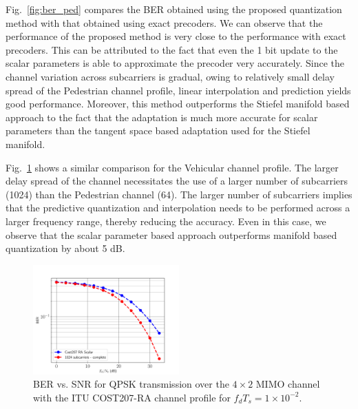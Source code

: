 \documentclass[journal,10pt,twocolumn]{IEEEtran}
\begin{document}
Fig.~\ref{fig:ber_ped} compares the BER obtained using the proposed
quantization method with that obtained using exact precoders. We can
observe that the performance of the proposed method is very close to
the performance with exact precoders. This can be attributed to the
fact that even the 1 bit update to the scalar parameters is able to
approximate the precoder very accurately. Since the channel variation
across subcarriers is gradual, owing to relatively small delay spread
of the Pedestrian channel profile, linear interpolation and prediction
yields good performance. Moreover, this method outperforms the Stiefel
manifold based approach to the fact that the adaptation is much more
accurate for scalar parameters than the tangent space based adaptation
used for the Stiefel manifold.

Fig.~\ref{fig:ber_veh} shows a similar comparison for the Vehicular
channel profile. The larger delay spread of the channel necessitates
the use of a larger number of subcarriers (1024) than the Pedestrian
channel (64). The larger number of subcarriers implies that the
predictive quantization and interpolation needs to be performed across
a larger frequency range, thereby reducing the accuracy. Even in this
case, we observe that the scalar parameter based approach outperforms
manifold based quantization by about 5 dB.

\begin{figure}
\includegraphics[width=0.5\textwidth]{images/cost01}
\caption{BER vs. SNR for QPSK transmission over the $4\times 2$ MIMO
  channel with the ITU COST207-RA channel profile for $f_dT_s = 1\times 10^{-2}$.}
\label{fig:ber_veh}
\end{figure}


\end{document}
